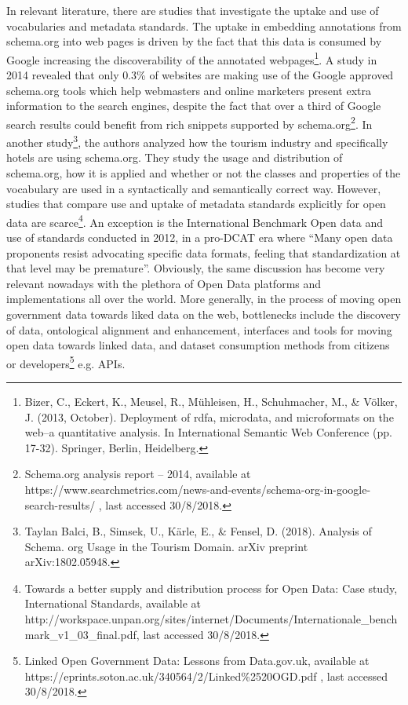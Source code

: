 \documentclass[<options>]{elsarticle}
\begin{document}
In relevant literature, there are studies that investigate the uptake and use of vocabularies and metadata standards. The uptake in embedding annotations from schema.org into web pages is driven by the fact that this data is consumed by Google increasing the discoverability of the annotated webpages\footnote{Bizer, C., Eckert, K., Meusel, R., Mühleisen, H., Schuhmacher, M., \& Völker, J. (2013, October). Deployment of rdfa, microdata, and microformats on the web–a quantitative analysis. In International Semantic Web Conference (pp. 17-32). Springer, Berlin, Heidelberg.}. A study in 2014 revealed that only 0.3\% of websites are making use of the Google approved schema.org tools which help webmasters and online marketers present extra information to the search engines, despite the fact that over a third of Google search results could benefit from rich snippets supported by schema.org\footnote{Schema.org analysis report – 2014, available at https://www.searchmetrics.com/news-and-events/schema-org-in-google-search-results/ , last accessed 30/8/2018.}.  In another study\footnote{Taylan Balci, B., Simsek, U., Kärle, E., \& Fensel, D. (2018). Analysis of Schema. org Usage in the Tourism Domain. arXiv preprint arXiv:1802.05948.}, the authors analyzed how the tourism industry and specifically hotels are using schema.org. They study the usage and distribution of schema.org, how it is applied and whether or not the classes and properties of the vocabulary are used in a syntactically and semantically correct way. 
However, studies that compare use and uptake of metadata standards explicitly for open data are scarce\footnote{Towards a better supply and distribution process for Open Data: Case study, International Standards, available at http://workspace.unpan.org/sites/internet/Documents/Internationale\_benchmark\_v1\_03\_final.pdf, last accessed 30/8/2018.}. An exception is the International Benchmark Open data and use of standards conducted in 2012, in a pro-DCAT era where “Many open data proponents resist advocating specific data formats, feeling that standardization at that level may be premature”. Obviously, the same discussion has become very relevant nowadays with the plethora of Open Data platforms and implementations all over the world. 
More generally, in the process of moving open government data towards liked data on the web, bottlenecks include the discovery of data, ontological alignment and enhancement, interfaces and tools for moving open data towards linked data, and dataset consumption methods from citizens or developers\footnote{Linked Open Government Data: Lessons from Data.gov.uk, available at https://eprints.soton.ac.uk/340564/2/Linked\%2520OGD.pdf , last accessed 30/8/2018.} e.g. APIs.
\end{document}
